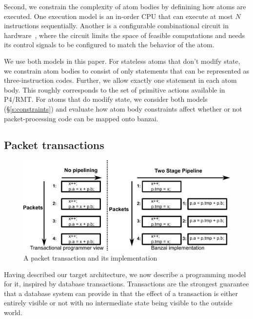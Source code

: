 Second, we constrain the complexity of atom bodies by definining how atoms are
executed. One execution model is an in-order CPU that can execute at most $N$
instructions sequentially. Another is a configurable combinational circuit in
hardware~\cite{dataflow}, where the circuit limits the space of feasible
computations and needs its control signals to be configured to match the
behavior of the atom.

We use both models in this paper. For stateless atoms that don't modify state,
we constrain atom bodies to consist of only statements that can be represented
as three-instruction codes. Further, we allow exactly one statement in each
atom body. This roughly corresponds to the set of primitive actions available
in P4/RMT.  For atoms that do modify state, we consider both models
(\S\ref{s:constraints}) and evaluate how atom body constraints affect whether
or not packet-processing code can be mapped onto banzai.

\subsection{Packet transactions}
\begin{figure}
  \includegraphics[width=\columnwidth]{spec_vs_impl.pdf}
  \caption{A packet transaction and its implementation}
  \label{fig:trans}
\end{figure}

Having described our target architecture, we now describe a programming model
for it, inspired by database transactions. Transactions are the strongest
guarantee that a database system can provide in that the effect of a
transaction is either entirely visible or not with no intermediate state being
visible to the outside world.

